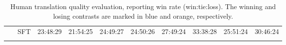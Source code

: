\begin{table}[!h]
{\begin{tabular}{clcccc|cccc}
~ & SFT & \colorbox{mlo}{23:48:29} & \colorbox{mlo}{21:54:25} & \colorbox{mlo}{24:49:27} & \colorbox{mlo}{24:50:26} & \colorbox{mlb}{27:49:24} & \colorbox{mlb}{33:38:28} & \colorbox{mlb}{25:51:24} & \colorbox{mlb}{30:46:24} \\
\Xhline{1.0pt}
\end{tabular}
}
\caption{Human translation quality evaluation, reporting win rate (win:tie:loss). The winning and losing contrasts are marked in \colorbox{mlb}{blue} and \colorbox{mlo}{orange}, respectively.}
\label{tab:humaneval}
\end{table}

